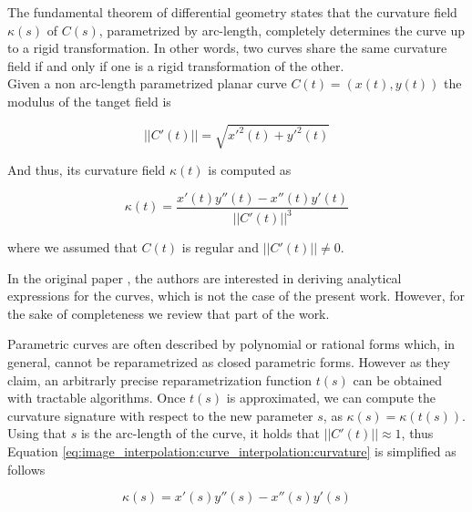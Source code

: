 \documentclass{ipol}
\begin{document}
The fundamental theorem of differential geometry states that the curvature field $\kappa (s)$ of $C(s)$, parametrized by arc-length, completely determines the curve up to a rigid transformation. In other words, two curves share the same curvature field if and only if one is a rigid transformation of the other.\\

Given a non arc-length parametrized planar curve $C(t)=\left( x(t),y(t) \right)$ the modulus of the tanget field is

\begin{equation}
||C'(t)||=\sqrt{x'^2(t)+y'^2(t)}
\label{eq:image_interpolation:curve_interpolation:velocity}
\end{equation}

And thus, its curvature field $\kappa (t)$ is computed as

\begin{equation}
\kappa (t)=\frac{x'(t)y''(t)-x''(t)y'(t)}{||C'(t)||^3}
\label{eq:image_interpolation:curve_interpolation:curvature}
\end{equation}

where we assumed that $C(t)$ is regular and $||C'(t)||\neq 0$.

In the original paper \cite{im_proc:curve_interpolation:elber:07:metamorphosis_planar_parametric_curves}, the authors are interested in deriving analytical expressions for the curves, which is not the case of the present work. However, for the sake of completeness we review that part of the work.

Parametric curves are often described by polynomial or rational forms which, in general, cannot be reparametrized as closed parametric forms. However as they claim, an arbitrarly precise reparametrization function $t(s)$ can be obtained with tractable algorithms. 
Once $t(s)$ is approximated, we can compute the curvature signature with respect to the new parameter $s$, as $\kappa (s)=\kappa (t(s))$. Using that $s$ is the arc-length of the curve, it holds that $||C'(t)||\approx 1$, thus Equation \ref{eq:image_interpolation:curve_interpolation:curvature} is simplified as follows

\begin{equation}
\kappa (s)=x'(s)y''(s)-x''(s)y'(s)
\label{eq:image_interpolation:curve_interpolation:curvature_reparametrized}
\end{equation}
\end{document}
